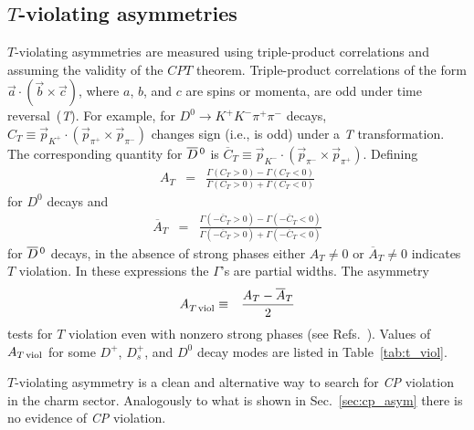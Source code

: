 \subsection{\emph{$T$}-violating asymmetries}
                                               
$T$-violating asymmetries are measured using triple-product
correlations and assuming the validity of the $CPT$ theorem.
Triple-product correlations of the form 
$\vec{a}\cdot(\vec{b}\times\vec{c})$, 
where $a$, $b$, and $c$ are spins or momenta, are odd 
under time reversal~(\emph{T}).
For example, for $D^0 \to K^+K^-\pi^+\pi^-$ decays, 
$C_T \equiv \vec{p}^{}_{K^+}\cdot(\vec{p}_{\pi^+}\times \vec{p}_{\pi^-})$  
changes sign (i.e., is odd) under a \emph{T} transformation.
The corresponding quantity for $\overline{D}{}^{\,0}$ is
$\overline{C}_T \equiv 
      \vec{p}^{}_{K^-}\cdot(\vec{p}_{\pi^-}\times \vec{p}_{\pi^+})$.
Defining  
\begin{eqnarray}
 A_{T} & = &
    \frac{\Gamma(C_T>0)-\Gamma(C_T<0)}{\Gamma(C_T>0)+\Gamma(C_T<0)}
\end{eqnarray}
for $D^0$ decays and
\begin{eqnarray}
\overline{A}_{T} & = & 
   \frac{\Gamma(-\overline{C}_T>0)-\Gamma(-\overline{C}_T<0)}
                        {\Gamma(-\overline{C}_T>0)+\Gamma(-\overline{C}_T<0)}
\end{eqnarray} 
for $\overline{D}{}^{\,0}$ decays, in the absence of strong phases
either $A^{}_T\neq 0$ or $\overline{A}^{}_T\neq 0$ indicates
$T$ violation. In these expressions the $\Gamma$'s are partial widths. 
The asymmetry
\begin{eqnarray}
A^{}_{T\,{\rm viol}} & \equiv & \frac{A_{T}-\overline{A}_{T}}{2}
\end{eqnarray}
tests for $T$ violation even with nonzero strong phases (see 
Refs.~\cite{Golowich:1988ig,Bigi:2001sg,Bensalem:2002ys,Bensalem:2000hq,Bensalem:2002pz}).
Values of $A_{T\,{\rm viol}}$ for some $D^+$, $D^+_s$, and
$D^0$ decay modes are listed in Table~\ref{tab:t_viol}.

$T$-violating asymmetry is a clean and alternative way to search for \emph{CP} violation
in the charm sector. Analogously to what is shown in Sec.~\ref{sec:cp_asym} 
there is no evidence of \emph{CP} violation. 


